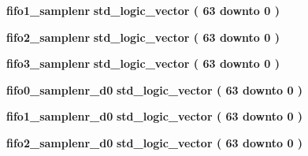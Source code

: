 \begin{DoxyCompactItemize}
{\bf fifo1\+\_\+samplenr} {\bfseries \textcolor{comment}{std\+\_\+logic\+\_\+vector}\textcolor{vhdlchar}{ }\textcolor{vhdlchar}{(}\textcolor{vhdlchar}{ }\textcolor{vhdlchar}{ } \textcolor{vhdldigit}{63} \textcolor{vhdlchar}{ }\textcolor{keywordflow}{downto}\textcolor{vhdlchar}{ }\textcolor{vhdlchar}{ } \textcolor{vhdldigit}{0} \textcolor{vhdlchar}{ }\textcolor{vhdlchar}{)}\textcolor{vhdlchar}{ }} 
\item 
{\bf fifo2\+\_\+samplenr} {\bfseries \textcolor{comment}{std\+\_\+logic\+\_\+vector}\textcolor{vhdlchar}{ }\textcolor{vhdlchar}{(}\textcolor{vhdlchar}{ }\textcolor{vhdlchar}{ } \textcolor{vhdldigit}{63} \textcolor{vhdlchar}{ }\textcolor{keywordflow}{downto}\textcolor{vhdlchar}{ }\textcolor{vhdlchar}{ } \textcolor{vhdldigit}{0} \textcolor{vhdlchar}{ }\textcolor{vhdlchar}{)}\textcolor{vhdlchar}{ }} 
\item 
{\bf fifo3\+\_\+samplenr} {\bfseries \textcolor{comment}{std\+\_\+logic\+\_\+vector}\textcolor{vhdlchar}{ }\textcolor{vhdlchar}{(}\textcolor{vhdlchar}{ }\textcolor{vhdlchar}{ } \textcolor{vhdldigit}{63} \textcolor{vhdlchar}{ }\textcolor{keywordflow}{downto}\textcolor{vhdlchar}{ }\textcolor{vhdlchar}{ } \textcolor{vhdldigit}{0} \textcolor{vhdlchar}{ }\textcolor{vhdlchar}{)}\textcolor{vhdlchar}{ }} 
\item 
{\bf fifo0\+\_\+samplenr\+\_\+d0} {\bfseries \textcolor{comment}{std\+\_\+logic\+\_\+vector}\textcolor{vhdlchar}{ }\textcolor{vhdlchar}{(}\textcolor{vhdlchar}{ }\textcolor{vhdlchar}{ } \textcolor{vhdldigit}{63} \textcolor{vhdlchar}{ }\textcolor{keywordflow}{downto}\textcolor{vhdlchar}{ }\textcolor{vhdlchar}{ } \textcolor{vhdldigit}{0} \textcolor{vhdlchar}{ }\textcolor{vhdlchar}{)}\textcolor{vhdlchar}{ }} 
\item 
{\bf fifo1\+\_\+samplenr\+\_\+d0} {\bfseries \textcolor{comment}{std\+\_\+logic\+\_\+vector}\textcolor{vhdlchar}{ }\textcolor{vhdlchar}{(}\textcolor{vhdlchar}{ }\textcolor{vhdlchar}{ } \textcolor{vhdldigit}{63} \textcolor{vhdlchar}{ }\textcolor{keywordflow}{downto}\textcolor{vhdlchar}{ }\textcolor{vhdlchar}{ } \textcolor{vhdldigit}{0} \textcolor{vhdlchar}{ }\textcolor{vhdlchar}{)}\textcolor{vhdlchar}{ }} 
\item 
{\bf fifo2\+\_\+samplenr\+\_\+d0} {\bfseries \textcolor{comment}{std\+\_\+logic\+\_\+vector}\textcolor{vhdlchar}{ }\textcolor{vhdlchar}{(}\textcolor{vhdlchar}{ }\textcolor{vhdlchar}{ } \textcolor{vhdldigit}{63} \textcolor{vhdlchar}{ }\textcolor{keywordflow}{downto}\textcolor{vhdlchar}{ }\textcolor{vhdlchar}{ } \textcolor{vhdldigit}{0} \textcolor{vhdlchar}{ }\textcolor{vhdlchar}{)}\textcolor{vhdlchar}{ }} 

\end{DoxyCompactItemize}
